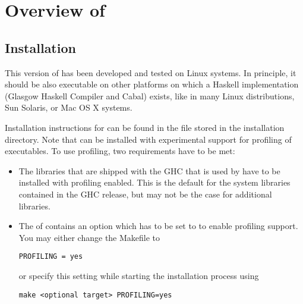 \section{Overview of \CYS}

\subsection{Installation}
\label{sec-install}

This version of \CYS has been developed and
tested on Linux systems.
In principle, it should be also executable on other
platforms on which a Haskell implementation (Glasgow Haskell Compiler
and Cabal) exists, like in many Linux distributions, Sun Solaris,
or Mac OS X systems.

Installation instructions for \CYS can be found in
the file  stored in the \CYS installation directory.
%
Note that \CYS can be installed with experimental support
for profiling
of executables. To use profiling, two requirements have to be met:
\begin{itemize}
\item The libraries that are shipped with the GHC that is used by \CYS
have to be installed with profiling enabled. This is the default for the system
libraries contained in the GHC release, but may not be the case for additional
libraries.
\item The  of \CYS contains an option 
which has to be set to  to enable profiling support. You may
either change the Makefile to
\begin{lstlisting}
PROFILING = yes
\end{lstlisting}
or specify this setting while starting the installation process using
\begin{lstlisting}
make <optional target> PROFILING=yes
\end{lstlisting}
\end{itemize}

